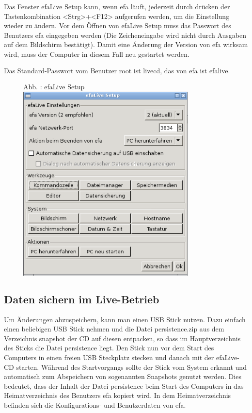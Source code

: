 \documentclass[a4paper,12pt,twoside]{article}
\newcounter{Abb}
\renewcommand\theAbb{\arabic{Abb}}
\begin{document}
Das Fenster efaLive Setup kann, wenn efa läuft, jederzeit durch drücken
der Tastenkombination
{\textless}Strg{\textgreater}+{\textless}F12{\textgreater} aufgerufen
werden, um die Einstellung wieder zu ändern. Vor dem Öffnen von efaLive
Setup muss das Passwort des Benutzers {\textquotedbl}efa{\textquotedbl}
eingegeben werden (Die Zeicheneingabe wird nicht durch Ausgaben auf dem
Bildschirm bestätigt). Damit eine Änderung der Version von efa wirksam
wird, muss der Computer in diesem Fall neu gestartet werden.


\bigskip

Das Standard-Passwort vom Benutzer {\textquotedbl}root{\textquotedbl}
ist {\textquotedbl}livecd{\textquotedbl}, das von
{\textquotedbl}efa{\textquotedbl} ist
{\textquotedbl}efalive{\textquotedbl}.


\bigskip


\bigskip


\bigskip



\begin{figure}
\centering
\begin{minipage}{9.006cm}
Abb. {\theAbb\label{seq:refAbb1}}: efaLive Setup
\includegraphics[width=9.006cm,height=10.028cm]{efaLivede-img/efaLivede-img3.png}\end{minipage}
\end{figure}
\subsection{Daten sichern im Live-Betrieb}
Um Änderungen abzuspeichern, kann man einen USB Stick nutzen. Dazu
einfach einen beliebigen USB Stick nehmen und die Datei persistence.zip
aus dem Verzeichnis snapshot der CD auf diesen entpacken, so dass im
Hauptverzeichnis des Sticks die Datei persistence liegt. Den Stick nun
vor dem Start des Computers in einen freien USB Steckplatz stecken und
danach mit der efaLive-CD starten. Während des Startvorgangs sollte der
Stick vom System erkannt und automatisch zum Abspeichern von
sogenannten Snapshots genutzt werden. Dies bedeutet, dass der Inhalt
der Datei persistence beim Start des Computers in das Heimatverzeichnis
des Benutzers {\textquotedbl}efa{\textquotedbl} kopiert wird. In dem
Heimatverzeichnis befinden sich die Konfigurations- und Benutzerdaten
von efa. 
\end{document}
